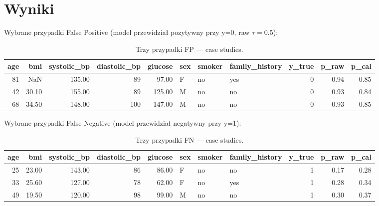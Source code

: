 \documentclass[12pt,a4paper]{article}
\begin{document}
\section{Wyniki}
Wybrane przypadki False Positive (model przewidział pozytywny przy y=0, raw $\tau=0.5$):

\begin{table}[H]
\centering
\begin{tabular}{rrrrrlllrrr}
\toprule
age & bmi & systolic\_bp & diastolic\_bp & glucose & sex & smoker & family\_history & y\_true & p\_raw & p\_cal \\
\midrule
81 & NaN & 135.00 & 89 & 97.00 & F & no & yes & 0 & 0.94 & 0.85 \\
42 & 30.10 & 155.00 & 89 & 125.00 & M & no & no & 0 & 0.93 & 0.84 \\
68 & 34.50 & 148.00 & 100 & 147.00 & M & no & no & 0 & 0.93 & 0.85 \\
\bottomrule
\end{tabular}

\caption{Trzy przypadki FP --- case studies.}
\label{tab:fp}
\end{table}

Wybrane przypadki False Negative (model przewidział negatywny przy y=1):

\begin{table}[H]
\centering
\begin{tabular}{rrrrrlllrrr}
\toprule
age & bmi & systolic\_bp & diastolic\_bp & glucose & sex & smoker & family\_history & y\_true & p\_raw & p\_cal \\
\midrule
25 & 23.00 & 143.00 & 86 & 86.00 & F & no & no & 1 & 0.17 & 0.28 \\
33 & 25.60 & 127.00 & 78 & 62.00 & F & no & yes & 1 & 0.28 & 0.34 \\
49 & 19.50 & 120.00 & 98 & 99.00 & M & no & no & 1 & 0.30 & 0.37 \\
\bottomrule
\end{tabular}

\caption{Trzy przypadki FN --- case studies.}
\label{tab:fn}
\end{table}
\end{document}
